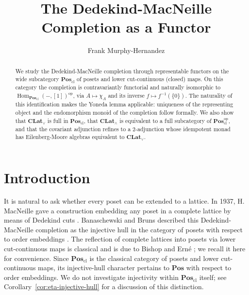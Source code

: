 \documentclass{amsart}
\title[The Dedekind-MacNeille Completion as a Functor]{The Dedekind-MacNeille Completion as a Functor}
\author{Frank Murphy-Hernandez}
\theoremstyle{plain}
\theoremstyle{definition}
\theoremstyle{remark}
\DeclareMathOperator{\Hom}{Hom}
\begin{document}
\begin{abstract}
We study the Dedekind-MacNeille completion through representable functors on the wide subcategory $\mathbf{Pos}_{\mathrm{cl}}$ of posets and lower cut-continuous (closed) maps. On this category the completion is contravariantly functorial and naturally isomorphic to $\Hom_{\mathbf{Pos}_{\mathrm{cl}}}(-,[1])^{\mathrm{op}}$, via $A\mapsto\chi_A$ and its inverse $f\mapsto f^{-1}(\{0\})$. The naturality of this identification makes the Yoneda lemma applicable: uniqueness of the representing object and the endomorphism monoid of the completion follow formally. We also show that $\mathbf{CLat}_\vee$ is full in $\mathbf{Pos}_{\mathrm{cl}}$, that $\mathbf{CLat}_\wedge$ is equivalent to a full subcategory of $\mathbf{Pos}_{\mathrm{cl}}^{\mathrm{op}}$, and that the covariant adjunction refines to a $2$-adjunction whose idempotent monad has Eilenberg-Moore algebras equivalent to $\mathbf{CLat}_\vee$.
\end{abstract}

\maketitle


\section{Introduction}\label{sec:intro}

It is natural to ask whether every poset can be extended to a lattice. In 1937, H. MacNeille gave a construction embedding any poset in a complete lattice by means of Dedekind cuts \cite{macneille1937partially}. Banaschewski and Bruns described this Dedekind-MacNeille completion as the injective hull in the category of posets with respect to order embeddings \cite{banaschewski1967categorical}. The reflection of complete lattices into posets via lower cut-continuous maps is classical and is due to Bishop \cite{bishop1978universal} and Ern\'e \cite{erne1991dedekind}; we recall it here for convenience. Since $\mathbf{Pos}_{\mathrm{cl}}$ is the classical category of posets and lower cut-continuous maps, its injective-hull character pertains to $\mathbf{Pos}$ with respect to order embeddings. We do not investigate injectivity within $\mathbf{Pos}_{\mathrm{cl}}$ itself; see Corollary~\ref{cor:eta-injective-hull} for a discussion of this distinction.
\end{document}
